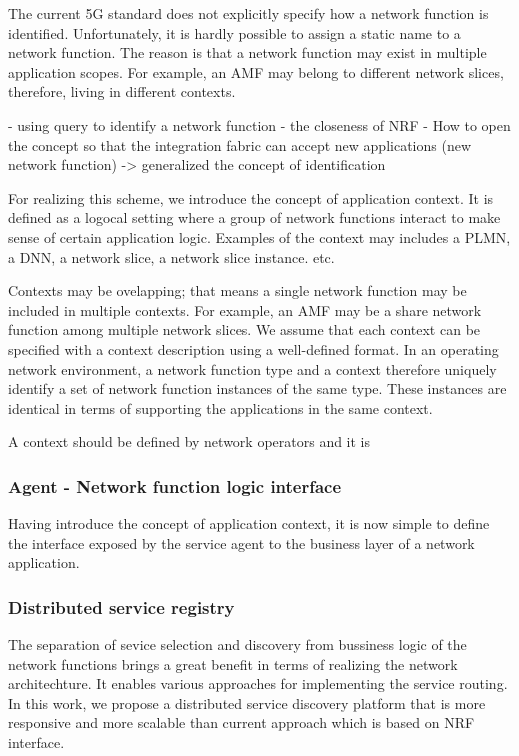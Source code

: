 \documentclass[a4paper]{article}
\begin{document}
The current 5G standard does not explicitly specify how a network function is identified. Unfortunately, it is hardly possible to assign a static name to a network function. The reason is that a network function may exist in multiple application scopes. For example, an AMF may belong to different network slices, therefore, living in different contexts. 


- using query to identify a network function
- the closeness of NRF
- How to open the concept so that the integration fabric can accept new applications (new network function) -> generalized the concept of identification

For realizing this scheme, we introduce the concept of application context. It is defined as a logocal setting where a group of network functions interact to make sense of certain application logic. Examples of the context may includes a PLMN, a DNN, a network slice, a network slice instance. etc. 

 

Contexts may be ovelapping; that means a single network function may be included in multiple contexts. For example, an AMF may be a share network function among multiple network slices. We assume that each context can be specified with a context description using a well-defined format. In an operating network environment, a network function type and a context therefore uniquely identify a set of network function instances of the same type. These instances are identical in terms of supporting the applications in the same context.

A context should be defined by network operators and it is 


\subsubsection{Agent - Network function logic interface}

Having introduce the concept of application context, it is now simple to define the interface exposed by the service agent to the business layer of a network application.



\subsubsection{Distributed service registry}

The separation of sevice selection and discovery from bussiness logic of the network functions brings a great benefit in terms of realizing the network architechture. It enables various approaches for implementing the service routing. In this work, we propose a distributed service discovery platform that is more responsive and more scalable than current approach which is based on NRF interface.
\end{document}
